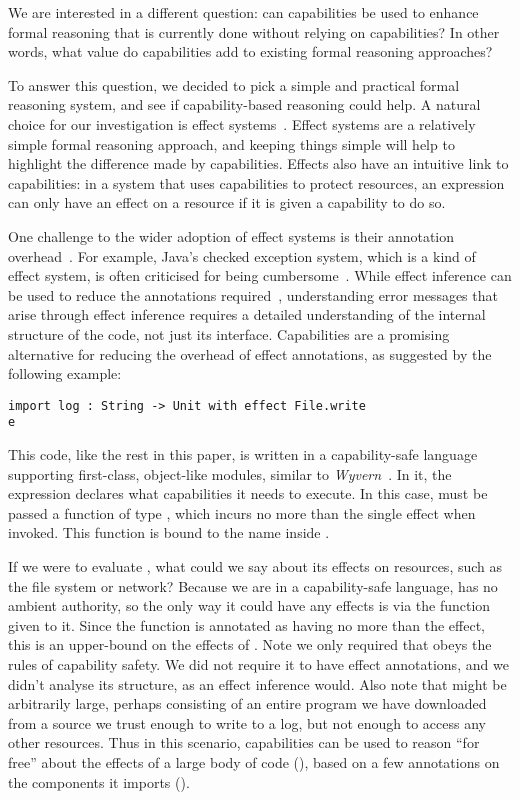 We are interested in a different question: can capabilities be used to
enhance formal reasoning that is currently done without relying on
capabilities?  In other words, what value do capabilities add to
existing formal reasoning approaches?

To answer this question, we
decided to pick a simple and practical formal reasoning system, and 
see if capability-based reasoning could help.  A natural choice for our
investigation is effect systems~\cite{nielson99}.  Effect systems
are a relatively simple formal reasoning approach, and keeping things
simple will help to highlight the difference made by capabilities.
 Effects also have an intuitive link to capabilities: in a system that
 uses capabilities to protect resources, an expression can only have
 an effect on a resource if it is given a capability to do so.

One challenge to the wider adoption of effect systems is their annotation
overhead~\cite{rytz12}. For example, Java's checked exception system, which
is a kind of effect system, is often criticised for being cumbersome~\cite{Kiniry2006}. While effect inference can be used to reduce the annotations required~\cite{koka14},
understanding error messages that arise through effect inference requires a detailed understanding of the internal structure of the code, not just its interface. Capabilities are a promising
alternative for reducing the overhead of effect annotations, as
suggested by the following example:

\begin{lstlisting}
import log : String -> Unit with effect File.write
e
\end{lstlisting}

This code, like the rest in this paper, is written in a capability-safe language supporting
first-class, object-like modules, similar to \textit{Wyvern}~\cite{kurilova16}. In it, the
expression  declares what capabilities it needs to execute. In this case,
 must be passed a function of type , which
incurs no more than the single  effect when invoked. This function is
bound to the name  inside .

If we were to evaluate , what could we say about its effects on resources,
such as the file system or network? Because we are in a capability-safe language,
 has no ambient authority, so the only way it could have any effects is via
the  function given to it. Since the  function is annotated as
having no more than the  effect, this is an upper-bound on the
effects of . Note we only required that  obeys the rules of
capability safety. We did not require it to have effect annotations, and we
didn't analyse its structure, as an effect inference would. Also note that 
might be arbitrarily large, perhaps consisting of an entire program we have
downloaded from a source we trust enough to write to a log, but not enough to
access any other resources. Thus in this scenario, capabilities can be used to
reason ``for free'' about the effects of a large body of code (), based on a
few annotations on the components it imports ().

